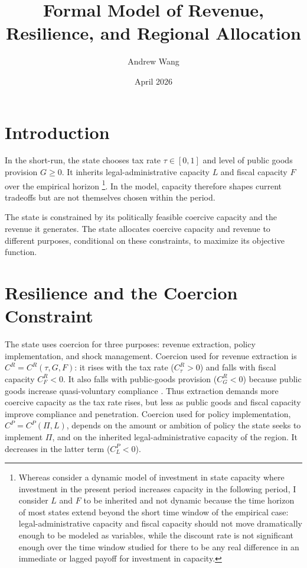 \documentclass[12pt]{article}
\title{Formal Model of Revenue, Resilience, and Regional Allocation}
\author{Andrew Wang}
\date{April 2026}
\begin{document}
\maketitle

\section*{Introduction}

In the short-run, the state chooses tax rate $\tau \in [0,1]$ and level of public goods provision $G \ge 0$. It inherits legal-administrative capacity $L$ and fiscal capacity $F$ over the empirical horizon \footnote{Whereas \cite{besleyOriginsStateCapacity2009} consider a dynamic model of investment in state capacity where investment in the present period increases capacity in the following period, I consider $L$ and $F$ to be inherited and not dynamic because the time horizon of most states extend beyond the short time window of the empirical case: legal-administrative capacity and fiscal capacity should not move dramatically enough to be modeled as variables, while the discount rate is not significant enough over the time window studied for there to be any real difference in an immediate or lagged payoff for investment in capacity.}. In the model, capacity therefore shapes current tradeoffs but are not themselves chosen within the period.

The state is constrained by its politically feasible coercive capacity and the revenue it generates. The state allocates coercive capacity and revenue to different purposes, conditional on these constraints, to maximize its objective function.

\section* {Resilience and the Coercion Constraint}

The state uses coercion for three purposes: revenue extraction, policy implementation, and shock management. Coercion used for revenue extraction is $C^R = C^R(\tau,G,F)$: it rises with the tax rate ($C^R_{\tau} > 0$) and falls with fiscal capacity $C^R_F < 0$. It also falls with public-goods provision ($C^R_G < 0$) because public goods increase quasi-voluntary compliance \cite{levi1988}. Thus extraction demands more coercive capacity as the tax rate rises, but less as public goods and fiscal capacity improve compliance and penetration. Coercion used for policy implementation, $C^P = C^P(\Pi,L)$, depends on the amount or ambition of policy the state seeks to implement $\Pi$, and on the inherited legal-administrative capacity of the region. It decreases in the latter term ($C^P_L < 0$).
\end{document}
